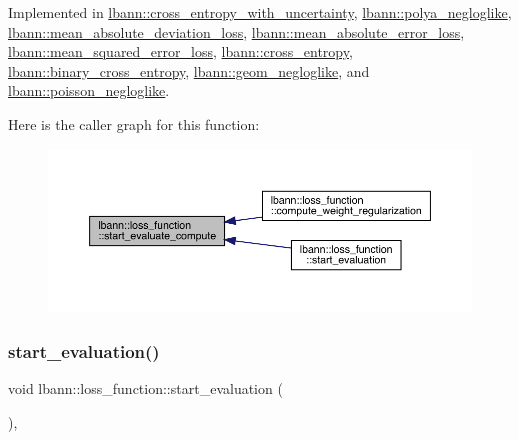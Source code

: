 Implemented in \hyperlink{classlbann_1_1cross__entropy__with__uncertainty_abed10e5c6eb2fd72b3b72ad1042fe35c}{lbann\+::cross\+\_\+entropy\+\_\+with\+\_\+uncertainty}, \hyperlink{classlbann_1_1polya__negloglike_aea7e92b3d290f3d11b6f8c93f9f9d3e6}{lbann\+::polya\+\_\+negloglike}, \hyperlink{classlbann_1_1mean__absolute__deviation__loss_a4e4340e4370b824c56b76ed59e2ba879}{lbann\+::mean\+\_\+absolute\+\_\+deviation\+\_\+loss}, \hyperlink{classlbann_1_1mean__absolute__error__loss_a6c93ac9c9dbcdec66e2a63caf25bccf9}{lbann\+::mean\+\_\+absolute\+\_\+error\+\_\+loss}, \hyperlink{classlbann_1_1mean__squared__error__loss_a5cfc9b54a4161015f63e5445e34f49f4}{lbann\+::mean\+\_\+squared\+\_\+error\+\_\+loss}, \hyperlink{classlbann_1_1cross__entropy_a5167b7709499516c6a4dbebfc561f6a7}{lbann\+::cross\+\_\+entropy}, \hyperlink{classlbann_1_1binary__cross__entropy_a4acaf96a18b00b38adae375a69740071}{lbann\+::binary\+\_\+cross\+\_\+entropy}, \hyperlink{classlbann_1_1geom__negloglike_ae17106630ad2f85df0dbd528bfbbea7d}{lbann\+::geom\+\_\+negloglike}, and \hyperlink{classlbann_1_1poisson__negloglike_ad69c0a20f5015ee02eb0c20e87129ffa}{lbann\+::poisson\+\_\+negloglike}.

Here is the caller graph for this function\+:\nopagebreak
\begin{figure}[H]
\begin{center}
\leavevmode
\includegraphics[width=350pt]{classlbann_1_1loss__function_a0bbe41060d788dc7a29f3737761a6f7d_icgraph}
\end{center}
\end{figure}
\mbox{\label{classlbann_1_1loss__function_a90f4126b0b4d47838ef3cc154c6d9705}} 
\subsubsection{\texorpdfstring{start\+\_\+evaluation()}{start\_evaluation()}}
{\footnotesize\ttfamily void lbann\+::loss\+\_\+function\+::start\+\_\+evaluation (\begin{DoxyParamCaption}{ }\end{DoxyParamCaption})\hspace{0.3cm}{\ttfamily [override]}, {\ttfamily [virtual]}}


